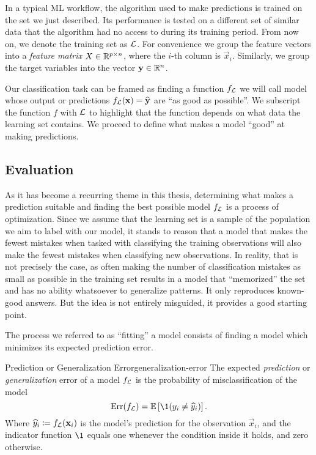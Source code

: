 In a typical ML workflow, the algorithm used to make predictions is trained on
the set we just described. Its performance is tested on a different set of
similar data that the algorithm had no access to during its training period.
From now on, we denote the training set as $\mathcal{L}$. For convenience we group the
feature vectors into a \textit{feature matrix} $X \in \mathbb{R}^{p \times n}$, where
the $i$-th column is $\vec{x}_i$. Similarly, we group the target variables into
the vector $\mathbf{y} \in \mathbb{R}^{n}$.

Our classification task can be framed as finding a function $f_{\mathcal{L}}$ we will
call model whose output or predictions $f_{\mathcal{L}} (\mathbf{x}) = \widehat{\mathbf{y}}$
are ``as good as possible''. We subscript the function $f$ with $\mathcal{L}$ to
highlight that the function depends on what data the learning set contains. We
proceed to define what makes a model ``good'' at making predictions.

\subsection{Evaluation}
As it has become a recurring theme in this thesis, determining what makes a
prediction suitable and finding the best possible model $f_{\mathcal{L}}$ is a process of
optimization. Since we assume that the learning set is a sample of the
population we aim to label with our model, it stands to reason that a model that
makes the fewest mistakes when tasked with classifying the training observations
will also make the fewest mistakes when classifying new observations. In
reality, that is not precisely the case, as often making the number of
classification mistakes as small as possible in the training set results in a
model that ``memorized'' the set and has no ability whatsoever to generalize
patterns. It only reproduces known-good answers. But the idea is not entirely
misguided, it provides a good starting point.

The process we referred to as ``fitting'' a model consists of finding a model
which minimizes its expected prediction error.

\begin{dfn}{Prediction or Generalization Error}{generalization-error}
    The expected \emph{prediction} or \emph{generalization} error of a model
    $f_{\mathcal{L}}$ is the probability of misclassification of the model
    \begin{equation*}
        \Err (f_\L) = \mathbb{E} \left[ \1 (y_i \neq \widehat{y}_i)  \right].
    \end{equation*}
    Where $\widehat{y}_i \coloneqq f_{\mathcal{L}} (\mathbf{x}_i)$ is the model's prediction
    for the observation $\vec{x}_i$, and the indicator function $\1$ equals one
    whenever the condition inside it holds, and zero otherwise.
\end{dfn}

